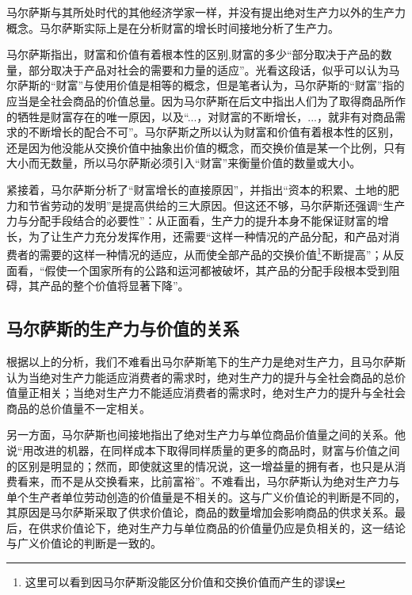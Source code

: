 马尔萨斯与其所处时代的其他经济学家一样，并没有提出绝对生产力以外的生产力概念。马尔萨斯实际上是在分析财富的增长时间接地分析了生产力。

马尔萨斯指出，财富和价值有着根本性的区别,财富的多少“部分取决于产品的数量，部分取决于产品对社会的需要和力量的适应”\cite[292]{BiLuo*SiLaFaDaWeiLiJiaTuQuanJiDi2JuanMaErSaSiZhengZhiJingJiXueYuanLiPingZhu2013}。光看这段话，似乎可以认为马尔萨斯的“财富”与使用价值是相等的概念，但是笔者认为，马尔萨斯的“财富”指的应当是全社会商品的价值总量。因为马尔萨斯在后文中指出人们为了取得商品所作的牺牲是财富存在的唯一原因\cite[292]{BiLuo*SiLaFaDaWeiLiJiaTuQuanJiDi2JuanMaErSaSiZhengZhiJingJiXueYuanLiPingZhu2013}，以及“...，对财富的不断增长，...，就非有对商品需求的不断增长的配合不可”\cite[355]{BiLuo*SiLaFaDaWeiLiJiaTuQuanJiDi2JuanMaErSaSiZhengZhiJingJiXueYuanLiPingZhu2013}。马尔萨斯之所以认为财富和价值有着根本性的区别，还是因为他没能从交换价值中抽象出价值的概念，而交换价值是某一个比例，只有大小而无数量，所以马尔萨斯必须引入“财富”来衡量价值的数量或大小。

紧接着，马尔萨斯分析了“财富增长的直接原因”，并指出“资本的积累、土地的肥力和节省劳动的发明”是提高供给的三大原因\cite[355]{BiLuo*SiLaFaDaWeiLiJiaTuQuanJiDi2JuanMaErSaSiZhengZhiJingJiXueYuanLiPingZhu2013}。但这还不够，马尔萨斯还强调“生产力与分配手段结合的必要性”\cite[356]{BiLuo*SiLaFaDaWeiLiJiaTuQuanJiDi2JuanMaErSaSiZhengZhiJingJiXueYuanLiPingZhu2013}：从正面看，生产力的提升本身不能保证财富的增长，为了让生产力充分发挥作用，还需要“这样一种情况的产品分配，和产品对消费者的需要的这样一种情况的适应，从而使全部产品的交换价值\footnote{这里可以看到因马尔萨斯没能区分价值和交换价值而产生的谬误}不断提高”\cite[356]{BiLuo*SiLaFaDaWeiLiJiaTuQuanJiDi2JuanMaErSaSiZhengZhiJingJiXueYuanLiPingZhu2013}；从反面看，“假使一个国家所有的公路和运河都被破坏，其产品的分配手段根本受到阻碍，其产品的整个价值将显著下降”\cite[357]{BiLuo*SiLaFaDaWeiLiJiaTuQuanJiDi2JuanMaErSaSiZhengZhiJingJiXueYuanLiPingZhu2013}。

\subsection{马尔萨斯的生产力与价值的关系}

根据以上的分析，我们不难看出马尔萨斯笔下的生产力是绝对生产力，且马尔萨斯认为当绝对生产力能适应消费者的需求时，绝对生产力的提升与全社会商品的总价值量正相关；当绝对生产力不能适应消费者的需求时，绝对生产力的提升与全社会商品的总价值量不一定相关。

另一方面，马尔萨斯也间接地指出了绝对生产力与单位商品价值量之间的关系。他说“用改进的机器，在同样成本下取得同样质量的更多的商品时，财富与价值之间的区别是明显的；然而，即使就这里的情况说，这一增益量的拥有者，也只是从消费看来，而不是从交换看来，比前富裕”\cite[291]{BiLuo*SiLaFaDaWeiLiJiaTuQuanJiDi2JuanMaErSaSiZhengZhiJingJiXueYuanLiPingZhu2013}。不难看出，马尔萨斯认为绝对生产力与单个生产者单位劳动创造的价值量是不相关的。这与广义价值论的判断是不同的，其原因是马尔萨斯采取了供求价值论，商品的数量增加会影响商品的供求关系。最后，在供求价值论下，绝对生产力与单位商品的价值量仍应是负相关的，这一结论与广义价值论的判断是一致的。

